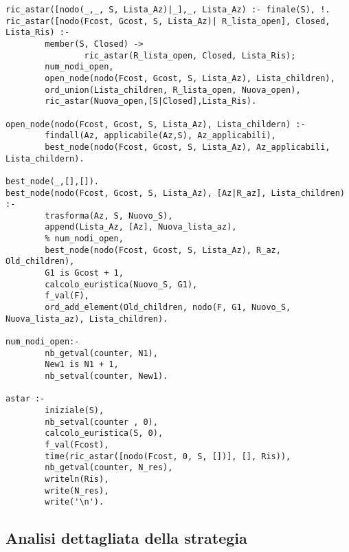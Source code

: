 \begin{lstlisting}
ric_astar([nodo(_,_, S, Lista_Az)|_],_, Lista_Az) :- finale(S), !.
ric_astar([nodo(Fcost, Gcost, S, Lista_Az)| R_lista_open], Closed, Lista_Ris) :-
        member(S, Closed) ->
                ric_astar(R_lista_open, Closed, Lista_Ris);
        num_nodi_open,
        open_node(nodo(Fcost, Gcost, S, Lista_Az), Lista_children),
        ord_union(Lista_children, R_lista_open, Nuova_open),
        ric_astar(Nuova_open,[S|Closed],Lista_Ris).

open_node(nodo(Fcost, Gcost, S, Lista_Az), Lista_childern) :-
        findall(Az, applicabile(Az,S), Az_applicabili),
        best_node(nodo(Fcost, Gcost, S, Lista_Az), Az_applicabili, Lista_childern).

best_node(_,[],[]).
best_node(nodo(Fcost, Gcost, S, Lista_Az), [Az|R_az], Lista_children) :-
        trasforma(Az, S, Nuovo_S),
        append(Lista_Az, [Az], Nuova_lista_az),
        % num_nodi_open,
        best_node(nodo(Fcost, Gcost, S, Lista_Az), R_az, Old_children),
        G1 is Gcost + 1,
        calcolo_euristica(Nuovo_S, G1),
        f_val(F),
        ord_add_element(Old_children, nodo(F, G1, Nuovo_S, Nuova_lista_az), Lista_children).

num_nodi_open:-
        nb_getval(counter, N1),
        New1 is N1 + 1,
        nb_setval(counter, New1).

astar :-
        iniziale(S),
        nb_setval(counter , 0),
        calcolo_euristica(S, 0),
        f_val(Fcost),
        time(ric_astar([nodo(Fcost, 0, S, [])], [], Ris)),
        nb_getval(counter, N_res),
        writeln(Ris),
        write(N_res),
        write('\n').
\end{lstlisting}

\subsection{Analisi dettagliata della strategia}

